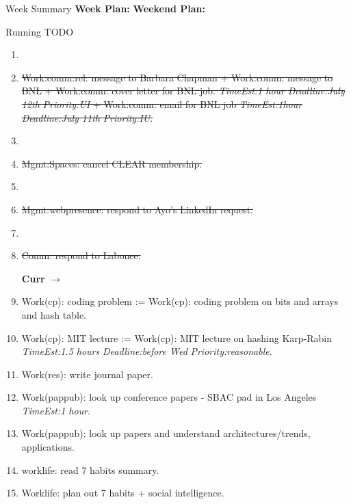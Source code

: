 \documentclass[serif, mathserif, final]{beamer}
\newcommand{\doneTask}[1]{\tiny \item \tiny \sout{#1}}
\newcommand{\te}[1]{\textit{TimeEst:}\textit{#1}}
\newcommand{\dl}[1]{\textit{Deadline:}\textit{#1}}
\newcommand{\pr}[1]{\textit{Priority:}\textit{#1}}
\begin{document}
\begin{frame}
\begin{columns}
\begin{column}{0.5\linewidth}

      \begin{block}{Week Summary}
        {\tiny \textbf{Week Plan:}   }
        {\tiny \textbf{Weekend Plan:}  }   
      \end{block}

      \begin{block}{Running TODO} %
        \begin{enumerate} 

        \item \tiny \doneTask{Work:comm:rel: message to Barbara Chapman +
          Work:comm: message to BNL +  Work:comm: cover letter for BNL job. \te{1 hour}
          \dl{July 12th} \pr{UI} + Work:comm: email for BNL job \te{1hour} \dl{July 11th}
          \pr{IU}. }

        \item \tiny \doneTask{Mgmt:Spaces: cancel CLEAR membership. }

        \item \tiny \doneTask{Mgmt:webpresence: respond to Ayo's
          LinkedIn request.} 

        \item \tiny \doneTask{Comm: respond to Labonee.}

\textbf{Curr} $\rightarrow$
          
        \item \tiny Work(cp): coding problem := Work(cp): coding problem on
          bits and arrays and hash table. 
        \item \tiny Work(cp): MIT lecture := Work(cp): MIT lecture on
          hashing Karp-Rabin \te{1.5 hours} \dl{before Wed}
          \pr{reasonable}. 

        \item \tiny Work(res): write journal paper. 
        \item \tiny Work(pappub): look up conference papers - SBAC pad in Los
          Angeles \te{1 hour}. 

        \item \tiny Work(pappub): look up papers and understand
          architectures/trends, applications. 

        \item \tiny worklife: read 7 habits summary. 
        \item \tiny Worklife: plan out 7 habits + social
          intelligence. 


\end{enumerate}
\end{block}
\end{column}
\end{columns}
\end{frame}
\end{document}
